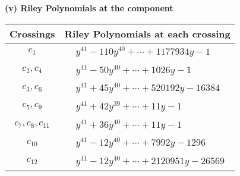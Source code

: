 \documentclass[1p]{elsarticle_modified}
\theoremstyle{definition}
\begin{document}
\flushleft \textbf{(v) Riley Polynomials at the component}\newline \\
\begin{tabular}{m{50pt}|m{274pt}}
Crossings & \hspace{64pt}Riley Polynomials at each crossing \\
\hline $$\begin{aligned}c_{1}\end{aligned}$$&$\begin{aligned}
&y^{41}-110 y^{40}+\cdots+1177934 y-1
\end{aligned}$\\
\hline $$\begin{aligned}c_{2},c_{4}\end{aligned}$$&$\begin{aligned}
&y^{41}-50 y^{40}+\cdots+1026 y-1
\end{aligned}$\\
\hline $$\begin{aligned}c_{3},c_{6}\end{aligned}$$&$\begin{aligned}
&y^{41}+45 y^{40}+\cdots+520192 y-16384
\end{aligned}$\\
\hline $$\begin{aligned}c_{5},c_{9}\end{aligned}$$&$\begin{aligned}
&y^{41}+42 y^{39}+\cdots+11 y-1
\end{aligned}$\\
\hline $$\begin{aligned}c_{7},c_{8},c_{11}\end{aligned}$$&$\begin{aligned}
&y^{41}+36 y^{40}+\cdots+11 y-1
\end{aligned}$\\
\hline $$\begin{aligned}c_{10}\end{aligned}$$&$\begin{aligned}
&y^{41}-12 y^{40}+\cdots+7992 y-1296
\end{aligned}$\\
\hline $$\begin{aligned}c_{12}\end{aligned}$$&$\begin{aligned}
&y^{41}-12 y^{40}+\cdots+2120951 y-26569
\end{aligned}$\\
\hline
\end{tabular}\\~\\
\end{document}
